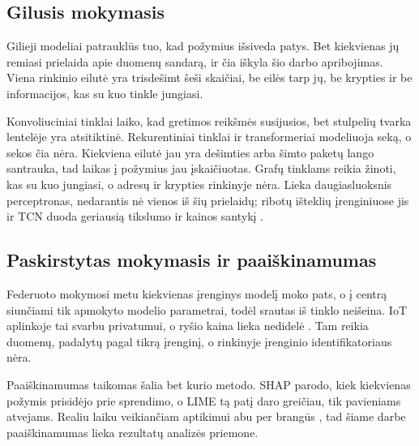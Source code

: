 \subsection{Gilusis mokymasis}

Gilieji modeliai patrauklūs tuo, kad požymius išsiveda patys. Bet
kiekvienas jų remiasi prielaida apie duomenų sandarą, ir čia iškyla šio
darbo apribojimas. Viena rinkinio eilutė yra
trisdešimt šeši skaičiai, be eilės tarp jų, be krypties ir be
informacijos, kas su kuo tinkle jungiasi.

Konvoliuciniai tinklai laiko, kad gretimos reikšmės susijusios, bet
stulpelių tvarka lentelėje yra atsitiktinė. Rekurentiniai tinklai ir
transformeriai modeliuoja seką, o sekos čia nėra. Kiekviena eilutė jau
yra dešimties arba šimto paketų lango santrauka, tad laikas į požymius
jau įskaičiuotas. Grafų tinklams reikia žinoti, kas su kuo jungiasi, o
adresų ir krypties rinkinyje nėra. Lieka daugiasluoksnis perceptronas,
nedarantis nė vienos iš šių prielaidų; ribotų išteklių įrenginiuose jis
ir TCN duoda geriausią tikslumo ir kainos santykį
\cite{mazinani2026constrained}.

\subsection{Paskirstytas mokymasis ir paaiškinamumas}

Federuoto mokymosi metu kiekvienas įrenginys modelį moko pats, o į
centrą siunčiami tik apmokyto modelio parametrai, todėl srautas iš
tinklo neišeina. IoT aplinkoje tai svarbu privatumui, o ryšio kaina
lieka nedidelė \cite{nassef2026tinyml}. Tam reikia duomenų, padalytų
pagal tikrą įrenginį, o rinkinyje įrenginio identifikatoriaus nėra.

Paaiškinamumas taikomas šalia bet kurio metodo. SHAP parodo, kiek
kiekvienas požymis prisidėjo prie sprendimo, o LIME tą patį daro
greičiau, tik pavieniams atvejams. Realiu laiku veikiančiam aptikimui
abu per brangūs \cite{mohale2025xai}, tad šiame darbe paaiškinamumas
lieka rezultatų analizės priemone.

